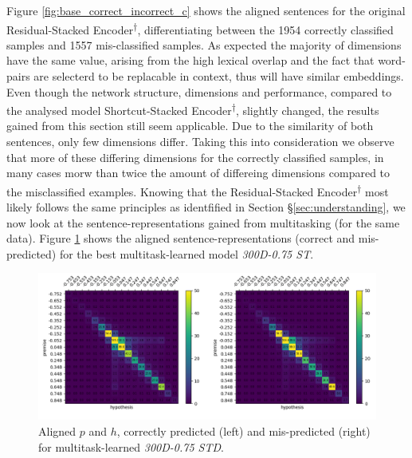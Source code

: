 Figure \ref{fig:base_correct_incorrect_c} shows the aligned sentences for the original Residual-Stacked Encoder\textsuperscript{$\dagger$}, differentiating between the 1954 correctly classified samples and 1557 mis-classified samples. As expected the majority of dimensions have the same value, arising from the high lexical overlap and the fact that word-pairs are selecterd to be replacable in context, thus will have similar embeddings. Even though the network structure, dimensions and performance, compared to the analysed model Shortcut-Stacked Encoder\textsuperscript{$\dagger$}, slightly changed, the results gained from this section still seem applicable. Due to the similarity of both sentences, only few dimensions differ. Taking this into consideration we observe that more of these differing dimensions for the correctly classified samples, in many cases morw than twice the amount of differeing dimensions compared to the misclassified examples. Knowing that the Residual-Stacked Encoder\textsuperscript{$\dagger$} most likely follows the same principles as identfified in Section §\ref{sec:understanding}, we now look at the sentence-representations gained from multitasking (for the same data). Figure \ref{fig:300d75_correct_incorrect_c} shows the aligned sentence-representations (correct and mis-predicted) for the best multitask-learned model \textit{300D-0.75 ST}.
\begin{figure}[tph!]
\centering
	\includegraphics[totalheight=7cm]{fig/300d75_correct_incorrect_c.png}
	\caption{Aligned $p$ and $h$, correctly predicted (left) and mis-predicted (right) for multitask-learned \textit{300D-0.75 STD}.}
	\label{fig:300d75_correct_incorrect_c}
\end{figure}
